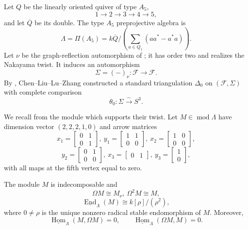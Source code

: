 \documentclass[12pt, twoside]{article}
\numberwithin{equation}{section}
\begin{document}
Let $Q$ be the linearly oriented quiver of type $A_5$,
\[
1\longrightarrow2\longrightarrow3\longrightarrow4\longrightarrow5,
\]
and let $\overline Q$ be its double. The type $A_5$ preprojective algebra is
\[
\Lambda=\Pi(A_5)=k\overline Q\Big/\left(\sum_{a\in Q_1}(aa^*-a^*a)\right).
\]
Let $\nu$ be the graph-reflection automorphism of \cite[Section 3.1]{CLLZ}; it has order two and realizes the Nakayama twist. It induces an automorphism
\[
\Sigma=(-)_\nu:\mathcal F\longrightarrow\mathcal F.
\]
By \cite[Remark 3.3]{CLLZ}, Chen--Liu--Lu--Zhang constructed a standard triangulation $\Delta_0$ on $(\mathcal F,\Sigma)$ with complete comparison
\begin{equation*}
\theta_0:\Sigma\xrightarrow{\sim}S^3.
\end{equation*}

We recall from \cite[Section 3.2]{CLLZ} the module which supports their twist. Let $M\in\operatorname{mod}\Lambda$ have dimension vector $(2,2,2,1,0)$ and arrow matrices
\[
x_1=\begin{bmatrix}0&1\\0&1\end{bmatrix},~
y_1=\begin{bmatrix}1&1\\0&0\end{bmatrix},~
x_2=\begin{bmatrix}1&0\\0&0\end{bmatrix},
\]
\[
y_2=\begin{bmatrix}0&1\\0&0\end{bmatrix},~
x_3=\begin{bmatrix}0&1\end{bmatrix},~
y_3=\begin{bmatrix}1\\0\end{bmatrix},
\]
with all maps at the fifth vertex equal to zero.

\begin{proposition}\rm\cite[Proposition 3.6]{CLLZ}\label{prop:M}
The module $M$ is indecomposable and
\[
\Omega M\cong M_\nu,~\Omega^2M\cong M,
\]
\begin{equation}\label{eq:endM}
\underline{\operatorname{End}}_\Lambda(M)\cong k[\rho]/(\rho^2),
\end{equation}
where $0\neq\rho$ is the unique nonzero radical stable endomorphism of $M$. Moreover,
\[
\underline{\operatorname{Hom}}_\Lambda(M,\Omega M)=0,
\qquad
\underline{\operatorname{Hom}}_\Lambda(\Omega M,M)=0.
\]
\end{proposition}
\end{document}
